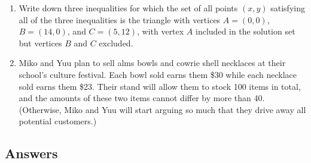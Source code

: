 \begin{enumerate}
\item Write down three inequalities for which the set of all points $(x,y)$ satisfying all of the three inequalities is the triangle with vertices $A = (0,0)$, $B = (14,0)$, and $C = (5,12)$, with vertex $A$ included in the solution set but vertices $B$ and $C$ excluded.
\item Miko and Yuu plan to sell alms bowls and cowrie shell necklaces at their school's culture festival. Each bowl sold earns them \$30 while each necklace sold earns them \$23. Their stand will allow them to stock 100 items in total, and the amounts of these two items cannot differ by more than 40. (Otherwise, Miko and Yuu will start arguing so much that they drive away all potential customers.)
\end{enumerate}



\subsection{Answers}